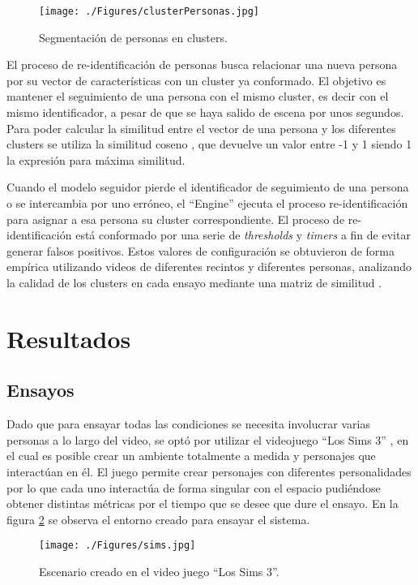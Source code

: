\documentclass[a4paper]{IEEEtran}
\begin{document}
\begin{figure}[htbp]
\centerline{\texttt{[image: ./Figures/clusterPersonas.jpg]}}
\caption{Segmentación de personas en clusters.}
\label{fig:clusterPersonas}
\end{figure}

El proceso de re-identificación de personas busca relacionar una nueva persona por su vector de características con un cluster ya conformado. El objetivo es mantener el seguimiento de una persona con el mismo cluster, es decir con el mismo identificador, a pesar de que se haya salido de escena por unos segundos. Para
poder calcular la similitud entre el vector de una persona y los diferentes clusters se utiliza la similitud coseno \cite{b15}, que devuelve un valor entre -1 y 1 siendo 1 la expresión para máxima similitud.

Cuando el modelo seguidor pierde el identificador de seguimiento de una persona o se intercambia por uno erróneo, el “Engine” ejecuta el proceso re-identificación para asignar a esa persona su cluster correspondiente. El proceso de re-identificación está conformado por una serie de \textit{thresholds} y \textit{timers} a fin de evitar generar falsos positivos. Estos valores de configuración se obtuvieron de forma empírica utilizando videos de diferentes recintos y diferentes personas, analizando la calidad de los clusters en cada ensayo mediante una matriz de similitud \cite{b16}.

\section{Resultados}

\subsection{Ensayos}

Dado que para ensayar todas las condiciones se necesita involucrar varias personas a lo largo del video, se optó por utilizar el videojuego “Los Sims 3” \cite{b17}, en el cual es posible crear un ambiente totalmente a medida y personajes que interactúan en él. El juego permite crear personajes con diferentes personalidades por lo que cada uno interactúa de forma singular con el espacio pudiéndose obtener distintas métricas por el tiempo que se desee que dure el ensayo. En la figura \ref{fig:sims} se observa el entorno creado para ensayar el sistema.

\begin{figure}[htbp]
\centerline{\texttt{[image: ./Figures/sims.jpg]}}
\caption{Escenario creado en el video juego ``Los Sims 3''.}
\label{fig:sims}
\end{figure}
\end{document}
